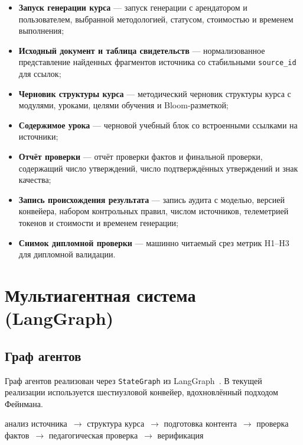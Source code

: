 \begin{itemize}
  \item \textbf{Запуск генерации курса} — запуск генерации с арендатором и пользователем,
    выбранной методологией, статусом, стоимостью и временем выполнения;
  \item \textbf{Исходный документ и таблица свидетельств} —
    нормализованное представление найденных фрагментов источника
    со стабильными \texttt{source\_id} для ссылок;
  \item \textbf{Черновик структуры курса} — методический черновик структуры
    курса с модулями, уроками, целями обучения и Bloom-разметкой;
  \item \textbf{Содержимое урока} — черновой учебный блок со встроенными
    ссылками на источники;
  \item \textbf{Отчёт проверки} — отчёт проверки фактов и
    финальной проверки, содержащий число утверждений, число
    подтверждённых утверждений и знак качества;
  \item \textbf{Запись происхождения результата} — запись аудита с моделью,
    версией конвейера, набором контрольных правил, числом источников,
    телеметрией токенов и стоимости и временем генерации;
  \item \textbf{Снимок дипломной проверки} — машинно читаемый
    срез метрик H1–H3 для дипломной валидации.
\end{itemize}

\section{Мультиагентная система (LangGraph)}

\subsection{Граф агентов}

Граф агентов реализован через \texttt{StateGraph}
из LangGraph~\cite{langgraph_docs_2025}. В текущей реализации
используется шестиузловой конвейер, вдохновлённый подходом Фейнмана.

\begin{center}
анализ источника~$\rightarrow$ структура курса~$\rightarrow$
подготовка контента~$\rightarrow$ проверка фактов~$\rightarrow$
педагогическая проверка~$\rightarrow$ верификация
\end{center}

